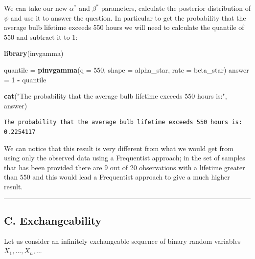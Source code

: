 \documentclass[
]{article}
\newenvironment{Shaded}{\begin{snugshade}}{\end{snugshade}}
\newcommand{\AttributeTok}[1]{\textcolor[rgb]{0.13,0.29,0.53}{#1}}
\newcommand{\DecValTok}[1]{\textcolor[rgb]{0.00,0.00,0.81}{#1}}
\newcommand{\FunctionTok}[1]{\textcolor[rgb]{0.13,0.29,0.53}{\textbf{#1}}}
\newcommand{\NormalTok}[1]{#1}
\newcommand{\OtherTok}[1]{\textcolor[rgb]{0.56,0.35,0.01}{#1}}
\newcommand{\SpecialCharTok}[1]{\textcolor[rgb]{0.81,0.36,0.00}{\textbf{#1}}}
\newcommand{\StringTok}[1]{\textcolor[rgb]{0.31,0.60,0.02}{#1}}
\begin{document}
We can take our new \(\alpha^*\) and \(\beta^*\) parameters, calculate
the posterior distribution of \(\psi\) and use it to answer the
question. In particular to get the probability that the average bulb
lifetime exceeds 550 hours we will need to calculate the quantile of
\(550\) and subtract it to \(1\):

\begin{Shaded}
\begin{Highlighting}[]
\FunctionTok{library}\NormalTok{(invgamma)}

\NormalTok{quantile }\OtherTok{=} \FunctionTok{pinvgamma}\NormalTok{(}\AttributeTok{q =} \DecValTok{550}\NormalTok{, }\AttributeTok{shape =}\NormalTok{ alpha\_star, }\AttributeTok{rate =}\NormalTok{ beta\_star)}
\NormalTok{answer }\OtherTok{=} \DecValTok{1} \SpecialCharTok{{-}}\NormalTok{ quantile}

\FunctionTok{cat}\NormalTok{(}\StringTok{"The probability that the average bulb lifetime exceeds 550 hours is:"}\NormalTok{,}
\NormalTok{    answer)}
\end{Highlighting}
\end{Shaded}

\begin{verbatim}
The probability that the average bulb lifetime exceeds 550 hours is: 0.2254117
\end{verbatim}

We can notice that this result is very different from what we would get
from using only the observed data using a Frequentist approach; in the
set of samples that has been provided there are \(9\) out of \(20\)
observations with a lifetime greater than \(550\) and this would lead a
Frequentist approach to give a much higher result.

\begin{center}\rule{0.5\linewidth}{0.5pt}\end{center}

\newpage

\hypertarget{c.-exchangeability}{%
\subsection{C. Exchangeability}\label{c.-exchangeability}}

Let us consider an infinitely exchangeable sequence of binary random
variables \(X_1,...,X_n,...\)
\end{document}
